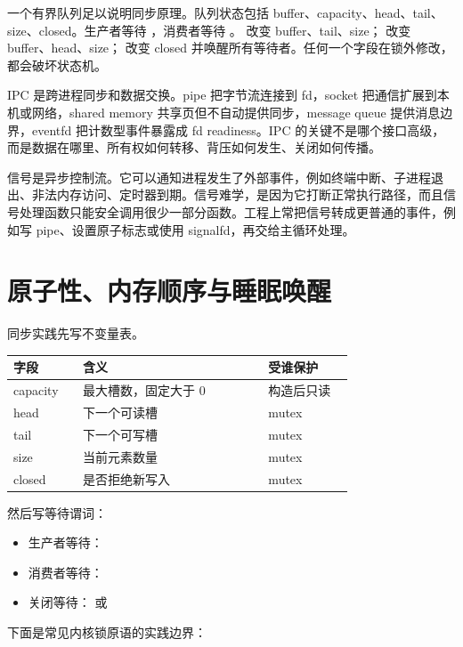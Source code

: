 一个有界队列足以说明同步原理。队列状态包括 buffer、capacity、head、tail、size、closed。生产者等待 ，消费者等待 。 改变 buffer、tail、size； 改变 buffer、head、size； 改变 closed 并唤醒所有等待者。任何一个字段在锁外修改，都会破坏状态机。

IPC 是跨进程同步和数据交换。pipe 把字节流连接到 fd，socket 把通信扩展到本机或网络，shared memory 共享页但不自动提供同步，message queue 提供消息边界，eventfd 把计数型事件暴露成 fd readiness。IPC 的关键不是哪个接口高级，而是数据在哪里、所有权如何转移、背压如何发生、关闭如何传播。

信号是异步控制流。它可以通知进程发生了外部事件，例如终端中断、子进程退出、非法内存访问、定时器到期。信号难学，是因为它打断正常执行路径，而且信号处理函数只能安全调用很少一部分函数。工程上常把信号转成更普通的事件，例如写 pipe、设置原子标志或使用 signalfd，再交给主循环处理。

\section{原子性、内存顺序与睡眠唤醒}

同步实践先写不变量表。

\begin{longtable}{p{0.18\linewidth}p{0.48\linewidth}p{0.22\linewidth}}
\toprule
字段 & 含义 & 受谁保护 \\
\midrule
capacity & 最大槽数，固定大于 0 & 构造后只读 \\
head & 下一个可读槽 & mutex \\
tail & 下一个可写槽 & mutex \\
size & 当前元素数量 & mutex \\
closed & 是否拒绝新写入 & mutex \\
\bottomrule
\end{longtable}

然后写等待谓词：

\begin{itemize}
\tightlist
\item 生产者等待：
\item 消费者等待：
\item 关闭等待： 或 
\end{itemize}

下面是常见内核锁原语的实践边界：

